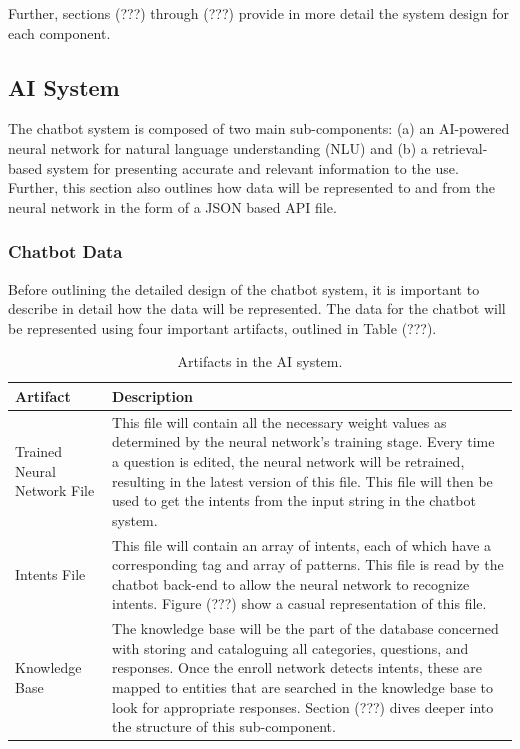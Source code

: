 \documentclass[titlepage, 12pt]{article}
\begin{document}
Further, sections (???) through (???) provide in more detail the system design for each component.

\subsection{AI System}

The chatbot system is composed of two main sub-components: (a) an AI-powered neural network for natural language understanding (NLU) and (b) a retrieval-based system for presenting accurate and relevant information to the use. Further, this section also outlines how data will be represented to and from the neural network in the form of a JSON based API file.

\subsubsection{Chatbot Data}

Before outlining the detailed design of the chatbot system, it is important to describe in detail how the data will be represented. The data for the chatbot will be represented using four important artifacts, outlined in Table (???).

\begin{center}
\begin{table}[h]
    \centering
    \begin{tabular}{ L{3cm} L{9cm} }
        \toprule
        \textbf{Artifact} & \textbf{Description}
        \tabularnewline
        \midrule
        Trained Neural Network File & This file will contain all the necessary weight values as determined by the neural network’s training stage. Every time a question is edited, the neural network will be retrained, resulting in the latest version of this file. This file will then be used to get the intents from the input string in the chatbot system.
        \tabularnewline
        \midrule 
        Intents File & This file will contain an array of intents, each of which have a corresponding tag and array of patterns. This file is read by the chatbot back-end to allow the neural network to recognize intents. Figure (???) show a casual representation of this file.
        \tabularnewline
        \midrule
        Knowledge Base & The knowledge base will be the part of the database concerned with storing and cataloguing all categories, questions, and responses. Once the enroll network detects intents, these are mapped to entities that are searched in the knowledge base to look for appropriate responses. Section (???) dives deeper into the structure of this sub-component.
        \tabularnewline
        \bottomrule
    \end{tabular}
    \caption{Artifacts in the AI system.}
\end{table}
\end{center}
\end{document}
